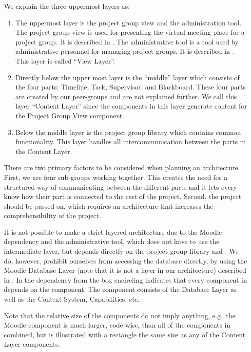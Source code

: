 We explain the three uppermost layers as:
\begin{enumerate}
	\item The uppermost layer is the project group view and the administration tool.
	The project group view is used for presenting the virtual meeting place for a project group.
	It is described in .
	The administrative tool is a tool used by administrative personnel for managing project groups.
	It is described in .
	This layer is called ``View Layer''.
	\item Directly below the upper most layer is the ``middle'' layer which consists of the four parts: Timeline, Task, Supervisor, and Blackboard.
	These four parts are created by our peer-groups and are not explained further.
	We call this layer ``Content Layer'' since the components in this layer generate content for the Project Group View component.
	\item Below the middle layer is the project group library which contains common functionality.
	This layer handles all intercommunication between the parts in the Content Layer.  
\end{enumerate}


There are two primary factors to be considered when planning an architecture. 
First, we are four sub-groups working together. 
This creates the need for a structured way of communicating between the different parts and it lets every \subgroup{} know how their part is connected to the rest of the project. 
Second, the project should be passed on, which requires an architecture that increases the comprehensibility of the project.

It is not possible to make a strict layered architecture due to the Moodle dependency and the administrative tool, which does not have to use the intermediate layer, but depends directly on the project group library and \moodle{}.
We do, however, prohibit ourselves from accessing the database directly, by using the Moodle Database Layer (note that it is not a layer in our architecture) described in .
In  the dependency from the box encircling \system{} indicates that every component in \system{} depends on the \moodle{} component.
The \moodle{} component consists of the Database Layer as well as the Context System, Capabilities, etc.

Note that the relative size of the components do not imply anything, e.g.\ the Moodle component is much larger, code wise, than all of the components in \system{} combined, but is illustrated with a rectangle the same size as any of the Content Layer components.













